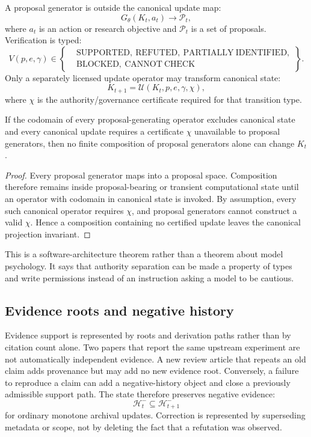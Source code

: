 A proposal generator is outside the canonical update map:
\[
G_\theta(K_t,a_t)\longrightarrow \mathcal P_t,
\]
where \(a_t\) is an action or research objective and \(\mathcal P_t\) is a set of proposals. Verification is typed:
\[
V(p,e,\gamma)\in
\left\{
\begin{aligned}
&\mathrm{SUPPORTED},\ \mathrm{REFUTED},\ \mathrm{PARTIALLY\ IDENTIFIED},\\
&\mathrm{BLOCKED},\ \mathrm{CANNOT\ CHECK}
\end{aligned}
\right\}.
\]
Only a separately licensed update operator may transform canonical state:
\[
K_{t+1}=\mathcal U(K_t,p,e,\gamma,\chi),
\]
where \(\chi\) is the authority/governance certificate required for that transition type.

\begin{proposition}\label{prop:proposal-non-sovereignty}
If the codomain of every proposal-generating operator excludes canonical state and every canonical update requires a certificate \(\chi\) unavailable to proposal generators, then no finite composition of proposal generators alone can change \(K_t\).
\end{proposition}

\begin{proof}
Every proposal generator maps into a proposal space. Composition therefore remains inside proposal-bearing or transient computational state until an operator with codomain in canonical state is invoked. By assumption, every such canonical operator requires \(\chi\), and proposal generators cannot construct a valid \(\chi\). Hence a composition containing no certified update leaves the canonical projection invariant.
\end{proof}

This is a software-architecture theorem rather than a theorem about model psychology. It says that authority separation can be made a property of types and write permissions instead of an instruction asking a model to be cautious.

\subsection{Evidence roots and negative history}

Evidence support is represented by roots and derivation paths rather than by citation count alone. Two papers that report the same upstream experiment are not automatically independent evidence. A new review article that repeats an old claim adds provenance but may add no new evidence root. Conversely, a failure to reproduce a claim can add a negative-history object and close a previously admissible support path. The state therefore preserves negative evidence:
\[
\mathcal H_t^{-}\subseteq \mathcal H_{t+1}^{-}
\]
for ordinary monotone archival updates. Correction is represented by superseding metadata or scope, not by deleting the fact that a refutation was observed.

